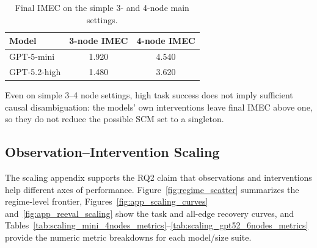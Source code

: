 \begin{table}[!ht]
\centering
\small
\setlength{\tabcolsep}{4pt}
\begin{tabular}{lcc}
\toprule
Model & 3-node IMEC & 4-node IMEC \\
\midrule
GPT-5-mini & 1.920 & 4.540 \\
GPT-5.2-high & 1.480 & 3.620 \\
\bottomrule
\end{tabular}
\caption{Final IMEC on the simple 3- and 4-node main settings.}
\label{tab:simple_graph_imec}
\end{table}

Even on simple 3--4 node settings, high task success does not imply sufficient
causal disambiguation: the models' own interventions leave final IMEC above
one, so they do not reduce the possible SCM set to a singleton.

\subsection{Observation--Intervention Scaling}
\label{app:observation_intervention_scaling}

The scaling appendix supports the RQ2 claim that observations and interventions
help different axes of performance. Figure~\ref{fig:regime_scatter} summarizes
the regime-level frontier, Figures~\ref{fig:app_scaling_curves}
and~\ref{fig:app_reeval_scaling} show the task and all-edge recovery curves,
and Tables~\ref{tab:scaling_mini_4nodes_metrics}--\ref{tab:scaling_gpt52_6nodes_metrics}
provide the numeric metric breakdowns for each model/size suite.

